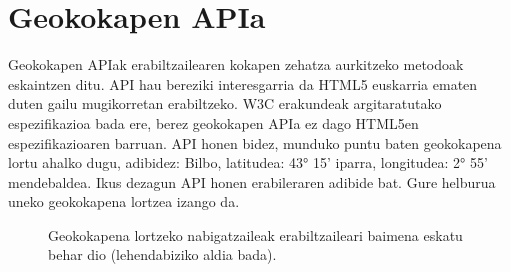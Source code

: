 \chapter{Geokokapen APIa}

Geokokapen APIak erabiltzailearen kokapen zehatza aurkitzeko metodoak eskaintzen ditu. API hau bereziki interesgarria da HTML5 euskarria ematen duten gailu mugikorretan erabiltzeko. W3C erakundeak argitaratutako espezifikazioa bada ere, berez geokokapen APIa ez dago HTML5en espezifikazioaren barruan.
API honen bidez, munduko puntu baten geokokapena lortu ahalko dugu, adibidez: Bilbo, latitudea: 43° 15' iparra, longitudea: 2° 55' mendebaldea.
Ikus dezagun API honen erabileraren adibide bat. Gure helburua uneko geokokapena lortzea izango da.

\begin{figure}[ht]
	\centering
{}
\caption{Geokokapena lortzeko nabigatzaileak erabiltzaileari baimena eskatu behar dio (lehendabiziko aldia bada).}
\label{fig:kokapenabaimena}
\end{figure}

